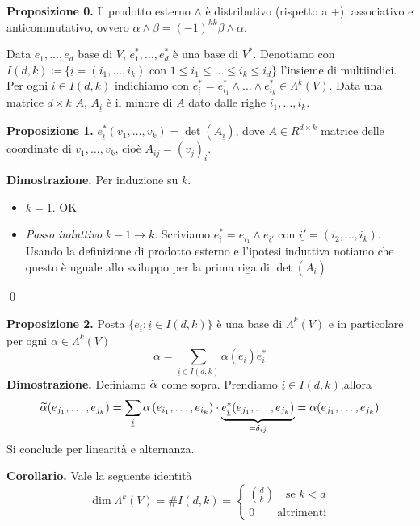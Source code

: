 \textbf{Proposizione 0.} Il prodotto esterno $\wedge$ è distributivo (rispetto a +), associativo e anticommutativo, ovvero $\alpha \wedge \beta = (-1)^{hk} \beta \wedge \alpha$.

Data $e_1,\ldots,e_d$ base di $V$, $e_1^*,\ldots,e_d^*$ è una base di $V^*$.
Denotiamo con $I(d,k) \coloneqq \{ \underline{i} = (i_1,\ldots,i_k) \text{ con } 1 \leq i_1 \leq \ldots \leq i_k \leq i_d \}$ l'insieme di multiindici.
Per ogni $i \in I(d,k)$ indichiamo con $e_{\underline{i}}^* = e_{i_1}^* \wedge \ldots \wedge e_{i_k}^* \in \Lambda^k(V)$. Data una matrice $d \times k$ $A$, $A_{\underline{i}}$ è il minore di $A$ dato dalle righe $i_1,\ldots,i_k$.

\textbf{Proposizione 1.} $e_{\underline{i}}^* (v_1,\ldots,v_k) = \det(A_{\underline{i}})$, dove $A \in R^{d\times k}$ matrice delle coordinate di $v_1,\ldots,v_k$, cioè $A_{ij} = (v_j)_i$.

\textbf{Dimostrazione.} Per induzione su $k$.
\begin{itemize}

	\item $k=1$. OK

	\item \textit{Passo induttivo} $k-1 \to k$. Scriviamo $e_{\underline{i}}^* = e_{i_1} \wedge e_{\underline{i'}}$ con $\underline{i'} = (i_2,\ldots,i_k)$.
	Usando la definizione di prodotto esterno e l'ipotesi induttiva notiamo che questo è uguale allo sviluppo per la prima riga di $\det(A_{\underline{i}})$

\end{itemize}
\qed

\textbf{Proposizione 2.} Posta $\{e_{\underline{i}} \colon \underline{i} \in I(d,k) \}$ è una base di $\Lambda^k(V)$ e in particolare per ogni $\alpha \in \Lambda^k(V)$
%
$$
	\alpha = \sum_{\underline{i} \in I(d,k)} \alpha(e_{\underline{i}}) e_{\underline{i}}^* 
$$
%
\textbf{Dimostrazione.} Definiamo $\widetilde{\alpha}$ come sopra. Prendiamo $\underline{i} \in I(d,k)$,allora
%
$$
\widetilde{\alpha}(e_{j_1},\ldots,e_{j_k}) = \sum_{\underline{i}} \alpha \left( e_{i_1},\ldots,e_{i_k} \right) \cdot \underbrace{e_{\underline{i}}^* (e_{j_1},\ldots,e_{j_k})}_{= \delta_{ij}} = \alpha (e_{j_1},\ldots,e_{j_k})
$$
%
Si conclude per linearità e alternanza.

\textbf{Corollario.} Vale la seguente identità 
%
$$
\dim \Lambda^k(V) = \# I(d,k) = 
\begin{cases}
	\binom{d}{k} \quad \text{se } k < d \\
	0 \qquad \text{altrimenti} 
\end{cases} 
$$
%

